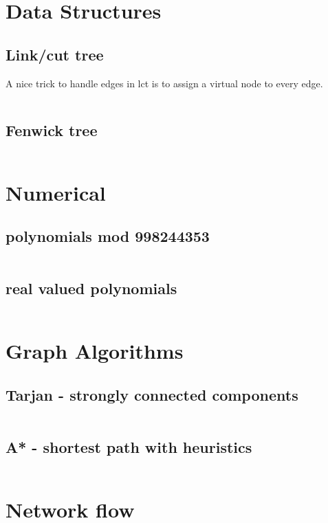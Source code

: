 \documentclass[portrait, 8pt, a4paper, oneside, landscape]{extarticle}
\begin{document}
\thispagestyle{empty}
\begin{figure}[h!]

\end{figure}
\newpage

\twocolumn
\maketitlepage
\newpage

\section{Data Structures}
\subsection{Link/cut tree}
A nice trick to handle edges in lct is to assign a virtual node to every edge.
\inputminted{cpp}{src/lct.cpp}
\subsection{Fenwick tree}
\inputminted{cpp}{src/fenwick2d.cpp}

\section{Numerical}
\subsection{polynomials mod 998244353}
\inputminted{cpp}{src/poly_mod.cpp}

\subsection{real valued polynomials}
\inputminted{cpp}{src/poly.cpp}

\section{Graph Algorithms}

\subsection{Tarjan - strongly connected components}
\inputminted{cpp}{src/scc.cpp}

\subsection{A* - shortest path with heuristics}
\inputminted{rust}{src/a_star.rs}

\section{Network flow}
\end{document}
